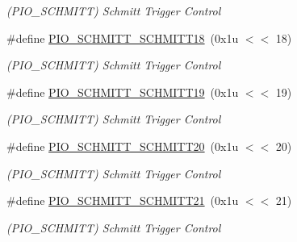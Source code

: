 \begin{DoxyCompactItemize}
\begin{DoxyCompactList}\small\item\em (P\+I\+O\+\_\+\+S\+C\+H\+M\+I\+TT) Schmitt Trigger Control \end{DoxyCompactList}\item 
\mbox{\label{group__SAMV71__PIO_ga2bca8d372d1159da7b064b5c0681a2de}} 
\#define \mbox{\hyperlink{group__SAMV71__PIO_ga2bca8d372d1159da7b064b5c0681a2de}{P\+I\+O\+\_\+\+S\+C\+H\+M\+I\+T\+T\+\_\+\+S\+C\+H\+M\+I\+T\+T18}}~(0x1u $<$$<$ 18)
\begin{DoxyCompactList}\small\item\em (P\+I\+O\+\_\+\+S\+C\+H\+M\+I\+TT) Schmitt Trigger Control \end{DoxyCompactList}\item 
\mbox{\label{group__SAMV71__PIO_gaff116da2e1b27c50e008c0ae9cf4b0c2}} 
\#define \mbox{\hyperlink{group__SAMV71__PIO_gaff116da2e1b27c50e008c0ae9cf4b0c2}{P\+I\+O\+\_\+\+S\+C\+H\+M\+I\+T\+T\+\_\+\+S\+C\+H\+M\+I\+T\+T19}}~(0x1u $<$$<$ 19)
\begin{DoxyCompactList}\small\item\em (P\+I\+O\+\_\+\+S\+C\+H\+M\+I\+TT) Schmitt Trigger Control \end{DoxyCompactList}\item 
\mbox{\label{group__SAMV71__PIO_ga71d786a7318afe2c205cf874da861f95}} 
\#define \mbox{\hyperlink{group__SAMV71__PIO_ga71d786a7318afe2c205cf874da861f95}{P\+I\+O\+\_\+\+S\+C\+H\+M\+I\+T\+T\+\_\+\+S\+C\+H\+M\+I\+T\+T20}}~(0x1u $<$$<$ 20)
\begin{DoxyCompactList}\small\item\em (P\+I\+O\+\_\+\+S\+C\+H\+M\+I\+TT) Schmitt Trigger Control \end{DoxyCompactList}\item 
\mbox{\label{group__SAMV71__PIO_ga086b5bb562dd90a69287bd199432f5fb}} 
\#define \mbox{\hyperlink{group__SAMV71__PIO_ga086b5bb562dd90a69287bd199432f5fb}{P\+I\+O\+\_\+\+S\+C\+H\+M\+I\+T\+T\+\_\+\+S\+C\+H\+M\+I\+T\+T21}}~(0x1u $<$$<$ 21)
\begin{DoxyCompactList}\small\item\em (P\+I\+O\+\_\+\+S\+C\+H\+M\+I\+TT) Schmitt Trigger Control \end{DoxyCompactList}\item 

\end{DoxyCompactItemize}
